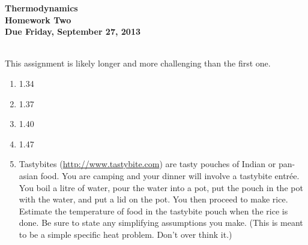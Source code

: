 \documentclass[12pt]{article}
\begin{document}
\pagestyle{empty}
 
\begin{center}
{\large {\bf Thermodynamics}}\\
\medskip
{\large {\bf Homework Two}}\\
\medskip
{ {\bf Due Friday, September 27, 2013}}\\
\end{center}

\hspace{2mm}\\

\indent This assignment is likely longer and more challenging than the
first one.  

\begin{enumerate}
\setlength{\itemsep}{1mm}
  \item 1.34
  \item 1.37 
  \item 1.40
  \item 1.47
  \item Tastybites (\url{http://www.tastybite.com}) are tasty pouches
    of Indian or pan-asian food.  You are camping and your dinner will
    involve a tastybite entr\'ee.  You boil a litre of water, pour the
    water into a pot, put the pouch in the pot with the water, and put
    a lid on the pot.  You then proceed to make rice.  Estimate the
    temperature of food in the tastybite pouch when the rice is done.
    Be sure to state any simplifying assumptions you make.  (This is
    meant to be a simple specific heat problem.  Don't over think it.)

\end{enumerate}
\end{document}
